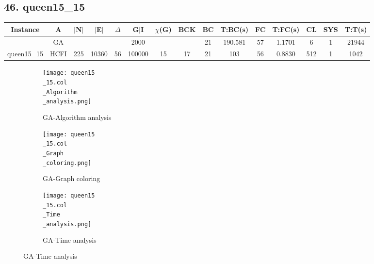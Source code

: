 \documentclass[10pt]{article}
\begin{document}
\subsection*{\hspace{0,9073976cm} 46. queen15\_15}
\begin{table}[H]
\centering
\begin{tabular}{|c|c|c|c|c|c|c|c|c|c|c|c|c|c|c|}
\hline
Instance& A &$|$N$|$ & $|$E$|$ & $\Delta$ & G$|$I & $\chi$(G) &BCK&BC & T:BC(s) & FC & T:FC(s) & CL & SYS & T:T(s) \\ \hline \hline

	&GA&       &                   &                     &   2000      &     \cellcolor{yellow} & {\cellcolor{yellow}}& {{\cellcolor{green}21}}
&190.581   &57        &1.1701                   & 6                   & 1         &21944         \\ \cline{2-2} \cline{6-6} \cline{9-15}
 \multirow{-2}{*}{queen15\_15} &HCFI   &\multirow{-2}{*}{225 }   &\multirow{-2}{*}{10360}     &\multirow{-2}{*}{56}     &100000     &\multirow{-2}{*}{\cellcolor{yellow}15}      & \multirow{-2}{*}{\cellcolor{yellow}17}    &{\cellcolor{green}21}     &103         &56    &0.8830         &512    &1     & 1042       \\ \hline
\end{tabular}
\end{table}
\graphicspath{{./Core1/Solutions/GA/queen15\_15.col}}
\begin{figure}[H]
\begin{subfigure}{.33\textwidth}
  \centering
  \texttt{[image: queen15\\\_15.col\\\_Algorithm\\\_analysis.png]}
  \caption{GA-Algorithm analysis}
   \label{fig:subfig1}
\end{subfigure}%
\begin{subfigure}{.33\textwidth}
  \centering
  \texttt{[image: queen15\\\_15.col\\\_Graph\\\_coloring.png]}
  \caption{GA-Graph coloring}
  \label{fig:subfig2}
\end{subfigure}
\begin{subfigure}{.33\textwidth}
  \centering
  \texttt{[image: queen15\\\_15.col\\\_Time\\\_analysis.png]}
  \caption{GA-Time analysis}
  \end{subfigure}
\end{figure}
\end{document}
